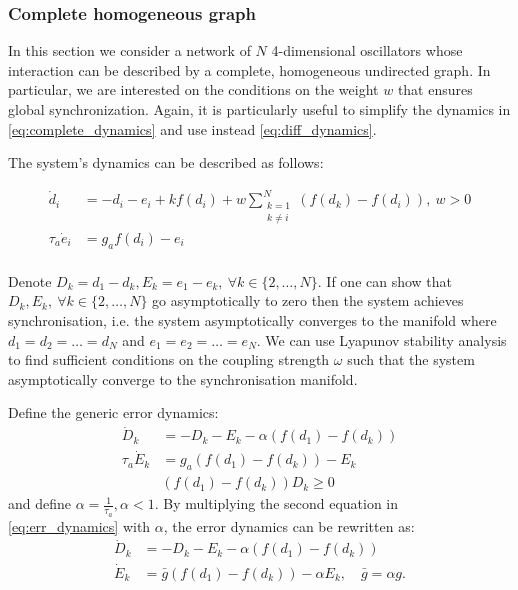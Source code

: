 \subsubsection{Complete homogeneous graph}
In this section we consider a network of $N$ 4-dimensional oscillators whose interaction can be described by a complete, homogeneous undirected graph. In particular, we are interested on the conditions on the weight $w$ that ensures global synchronization. Again, it is particularly useful to simplify the dynamics in \cref{eq:complete_dynamics} and use instead \cref{eq:diff_dynamics}. 

The system's dynamics can be described as follows:

\begin{equation} 
\begin{aligned}
\dot d_{i} &= - d_i - e_i + k f(d_i) + w\sum\limits_{\substack{k=1 \\ k\neq i}}^N (f(d_k) - f(d_i)), \ w > 0\\
\tau_a \dot{e}_{i} &= g_a f(d_i) - e_{i} \\
\end{aligned}
\label{eq:diff_dynamics_network}
\end{equation}

Denote $D_k = d_1 - d_k, E_k = e_1 - e_k,\ \forall k \in \{2, \dots, N\}$. If one can show that $D_k, E_k,\ \forall k \in \{2, \dots, N\}$ go asymptotically to zero then the system achieves synchronisation, i.e. the system asymptotically converges to the manifold where $d_1 = d_2 = \dots = d_N$ and $e_1 = e_2 = \dots = e_N$. We can use Lyapunov stability analysis to find sufficient conditions on the coupling strength $\omega$ such that the system asymptotically converge to the synchronisation manifold.

Define the generic error dynamics:
\begin{equation} 
\begin{aligned}
\dot D_{k} &= - D_k - E_k - \alpha (f(d_1) - f(d_k)) \\
\tau_a \dot{E}_{k} &= g_a (f(d_1) - f(d_k)) - E_{k} \\
&(f(d_1) - f(d_k))D_k \geq 0
\end{aligned}
\label{eq:err_dynamics}
\end{equation}
and define $\alpha = \frac{1}{\tau_a}, \alpha <1 $. By multiplying the second equation in \cref{eq:err_dynamics} with $\alpha$, the error dynamics can be rewritten as:
\begin{equation} 
\begin{aligned}
\dot D_{k} &= - D_k - E_k - \alpha (f(d_1) - f(d_k)) \\
\dot{E}_{k} &=  \bar g (f(d_1) - f(d_k)) - \alpha E_{k}, \quad \bar g = \alpha g. \\
\end{aligned}
\label{eq:err_dynamics}
\end{equation}

